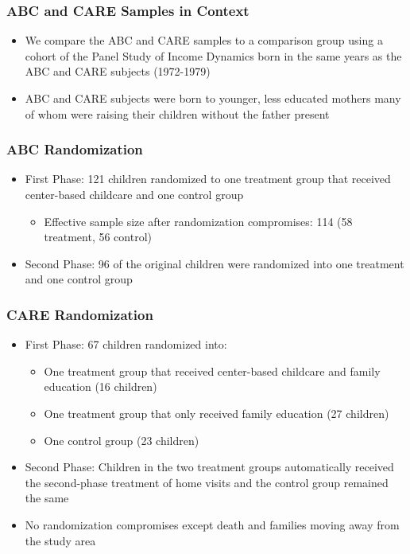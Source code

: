 \documentclass[static]{JJH-Beamer}
\begin{document}
\begin{frame}
\frametitle{ABC and CARE Samples in Context}

\begin{itemize}
\item We compare the ABC and CARE samples to a comparison group using a cohort of the Panel Study of Income Dynamics born in the same years as the ABC and CARE subjects (1972-1979)
\item ABC and CARE subjects were born to younger, less educated mothers many of whom were raising their children without the father present
\end{itemize}

\end{frame}

\begin{frame}
\frametitle{ABC Randomization}

\begin{itemize}
\item First Phase: 121 children randomized to one treatment group that received center-based childcare and one control group
	\begin{itemize}
	\item Effective sample size after randomization compromises: 114 (58 treatment, 56 control)
	\end{itemize}
\item Second Phase: 96 of the original children were randomized into one treatment and one control group
\end{itemize}

\end{frame}

\begin{frame}
\frametitle{CARE Randomization}

\begin{itemize}
\item First Phase: 67 children randomized into:
	\begin{itemize}
	\item One treatment group that received center-based childcare and family education (16 children)
	\item One treatment group that only received family education (27 children)
	\item One control group (23 children)
	\end{itemize}
\item Second Phase: Children in the two treatment groups automatically received the second-phase treatment of home visits and the control group remained the same
\item No randomization compromises except death and families moving away from the study area
\end{itemize}

\end{frame}
\end{document}

